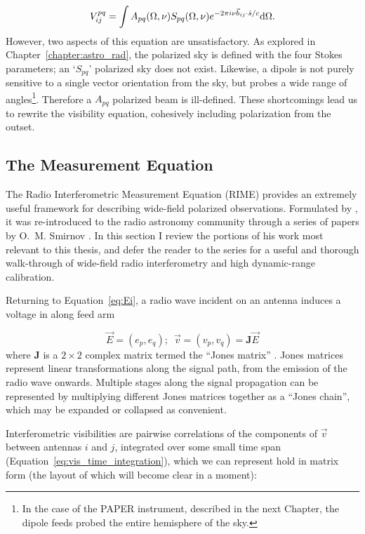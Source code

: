 \begin{equation}
V^{pq}_{ij} = \int A_{pq}(\Omega, \nu) S_{pq}(\Omega, \nu) e^{-2\pi i \nu \vec{b}_{ij}\cdot\hat{s}/c} {\rm d}\Omega.
\end{equation} 
However, two aspects of this equation are unsatisfactory. As explored in Chapter~\ref{chapter:astro_rad}, the polarized sky is defined with the four Stokes parameters; an `$S_{pq}$' polarized sky does not exist. Likewise, a dipole is not purely sensitive to a single vector orientation from the sky, but probes a wide range of angles\footnote{In the case of the PAPER instrument, described in the next Chapter, the dipole feeds probed the entire hemisphere of the sky.}. Therefore a $A_{pq}$ polarized beam is ill-defined. These shortcomings lead us to rewrite the visibility equation, cohesively including polarization from the outset.  

\subsection{The Measurement Equation}

The Radio Interferometric Measurement Equation (RIME) provides an extremely useful framework for describing wide-field polarized observations. Formulated by \cite{HBS.1.96}, it was re-introduced to the radio astronomy community through a series of papers by O.~M. Smirnov \citep{Smirnov.11, Smirnov.11.2, Smirnov.11.3, Smirnov.11.4}. In this section I review the portions of his work most relevant to this thesis, and defer the reader to the series for a useful and thorough walk-through of wide-field radio interferometry and high dynamic-range calibration.

Returning to Equation~\ref{eq:Ei}, a radio wave incident on an antenna induces a voltage in along feed arm

\begin{equation}
\vec{E} = (e_p, e_q);\,\,\,\vec{v} = (v_p,v_q) = \textbf{J}\vec{E}
\label{eq:voltage_jones}
\end{equation}
where \textbf{J} is a $2\times2$ complex matrix termed the ``Jones matrix'' \citep{Jones.41}. Jones matrices represent linear transformations along the signal path, from the emission of the radio wave onwards. Multiple stages along the signal propagation can be represented by multiplying different Jones matrices together as a ``Jones chain'', which may be expanded or collapsed as convenient.

Interferometric visibilities are pairwise correlations of the components of $\vec{v}$ between antennas $i$ and $j$, integrated over some small time span (Equation~\ref{eq:vis_time_integration}), which we can represent hold in matrix form (the layout of which will become clear in a moment):

